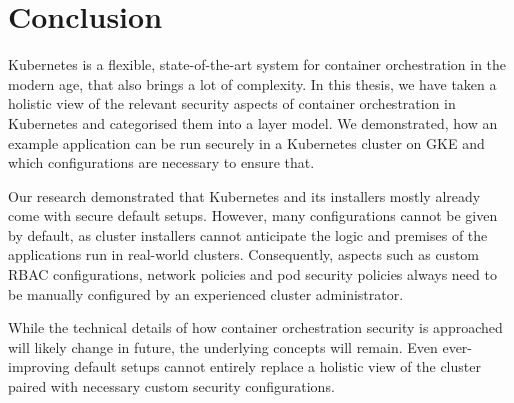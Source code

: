 \chapter{Conclusion} \label{chap:conclusion}

Kubernetes is a flexible, state-of-the-art system for container orchestration in the modern age, that also brings a lot of complexity. In this thesis, we have taken a holistic view of the relevant security aspects of container orchestration in Kubernetes and categorised them into a layer model. We demonstrated, how an example application can be run securely in a Kubernetes cluster on \acf{GKE} and which configurations are necessary to ensure that. 

Our research demonstrated that Kubernetes and its installers mostly already come with secure default setups. However, many configurations cannot be given by default, as cluster installers cannot anticipate the logic and premises of the applications run in real-world clusters. Consequently, aspects such as  custom \ac{RBAC} configurations, network policies and pod security policies always need to be manually configured by an experienced cluster administrator. 

While the technical details of how container orchestration security is approached will likely change in future, the underlying concepts will remain. Even ever-improving default setups cannot entirely replace a holistic view of the cluster paired with necessary custom security configurations.

